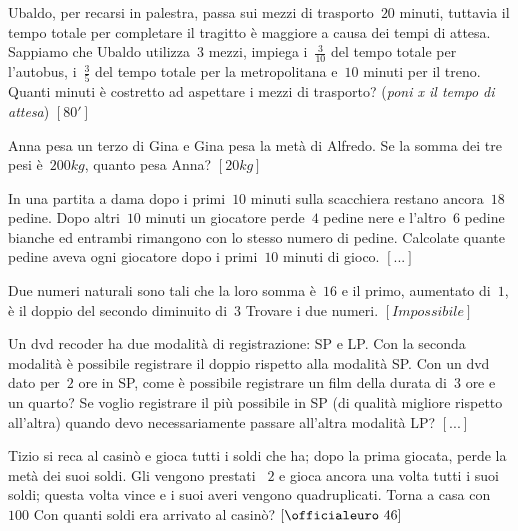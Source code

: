 \begin{multicols}{2}
\begin{esercizio}[\Ast]
\label{ese:14.50}
Ubaldo, per recarsi in palestra, passa sui mezzi di trasporto~\(20\) minuti, 
tuttavia il tempo totale per completare il tragitto è maggiore a causa dei 
tempi 
di attesa. Sappiamo che Ubaldo utilizza~\(3\) mezzi, impiega i~\(\frac{3}{10}\) del 
tempo totale per l'autobus, i~\(\frac{3}{5}\) del tempo totale per la 
metropolitana e~\(10\) minuti per il treno. Quanti minuti è costretto ad 
aspettare 
i mezzi di trasporto? (\emph{poni x il tempo di attesa})
 \hfill \(\left[80'\right]\)
\end{esercizio}

\begin{esercizio}[\Ast]
\label{ese:14.51}
Anna pesa un terzo di Gina e Gina pesa la metà di Alfredo. Se la somma dei tre 
pesi è~\(200\unit{kg}\), quanto pesa Anna? \hfill \(\left[20\unit{kg}\right]\)
\end{esercizio}

\begin{esercizio}
\label{ese:14.52}
In una partita a dama dopo i primi~\(10\) minuti sulla scacchiera restano 
ancora~\(18\) pedine. Dopo altri~\(10\) minuti un giocatore perde~\(4\) pedine nere e 
l'altro~\(6\) pedine bianche ed entrambi rimangono con lo stesso numero di 
pedine. 
Calcolate quante pedine aveva ogni giocatore dopo i primi~\(10\) minuti di gioco.
 \hfill \(\left[...\right]\)
\end{esercizio}

\begin{esercizio}[\Ast]
\label{ese:14.53}
Due numeri naturali sono tali che la loro somma è~\(16\) e il primo, aumentato 
di~\(1\), è il doppio del secondo diminuito di~\(3\) Trovare i due numeri.
 \hfill \(\left[Impossibile\right]\)
\end{esercizio}

\begin{esercizio}
\label{ese:14.54}
Un dvd recoder ha due modalità di registrazione: SP e LP. Con la seconda 
modalità è possibile registrare il doppio rispetto alla modalità SP. Con un dvd 
dato per~\(2\) ore in SP, come è possibile registrare un film della durata di~\(3\) 
ore e un quarto? Se voglio registrare il più possibile in SP (di qualità 
migliore rispetto all'altra) quando devo necessariamente passare all'altra 
modalità LP? \hfill \(\left[...\right]\)
\end{esercizio}

\begin{esercizio}[\Ast]
\label{ese:14.55}
Tizio si reca al casinò e gioca tutti i soldi che ha; dopo la prima giocata, 
perde la metà dei suoi soldi. Gli vengono prestati \officialeuro~\(2\) e gioca 
ancora una volta tutti i suoi soldi; questa volta vince e i suoi averi vengono 
quadruplicati. Torna a casa con \officialeuro~\(100\) Con quanti soldi era 
arrivato al casinò? \hfill \(\left[\officialeuro~46\right]\)
\end{esercizio}


\end{multicols}

